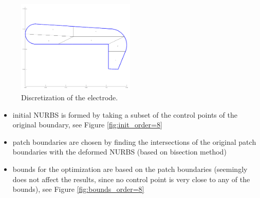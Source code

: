 \begin{center}
\begin{figure}[H]
    \includegraphics[width=0.5\textwidth]{fig/png/electrode}
    \caption{Discretization of the electrode.}
    \label{fig:electrode}
\end{figure}
\end{center}

\newpage

\begin{itemize}
    \item initial NURBS is formed by taking a subset of the control points of the original boundary, see Figure \ref{fig:init_order=8}
    \item patch boundaries are chosen by finding the intersections of the original patch boundaries with the deformed NURBS (based on bisection method)
    \item bounds for the optimization are based on the patch boundaries (seemingly does not affect the results, since no control point is very close to any of the bounds), see Figure \ref{fig:bounds_order=8}
\end{itemize}

